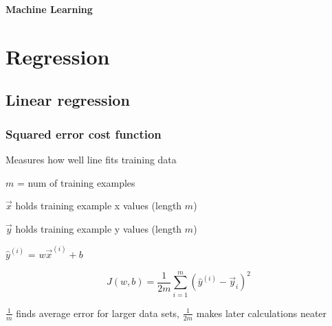 \documentclass[12pt]{article}
\begin{document}
\newcommand*\dif{\mathop{}\!\mathrm{d}}

\newenvironment{myitemize}
{ \begin{itemize}
    \setlength{\itemsep}{0pt}
    \setlength{\parskip}{0pt}
    \setlength{\parsep}{0pt}     }
{ \end{itemize}                  } 

\newenvironment{myenumerate}
{ \begin{enumerate}
    \setlength{\itemsep}{0pt}
    \setlength{\parskip}{0pt}
    \setlength{\parsep}{0pt}     }
{ \end{enumerate}                  } 

\begin{titlepage}
\begin{center}
\vspace*{2cm}
\begin{huge}\textbf{Machine Learning}\end{huge}
\end{center}
\end{titlepage}

\tableofcontents


\pagebreak

\section{Regression}

\subsection{Linear regression}
\subsubsection{Squared error cost function}

Measures how well line fits training data

$m$ = num of training examples

$\vec{x}$ holds training example x values (length $m$)

$\vec{y}$ holds training example y values (length $m$)

${\hat y}^{(i)}$ = $w\vec{x}^{(i)} + b$

\[ J(w,b) = \frac{1}{2m} \sum_{i=1}^m ({\hat y}^{(i)} - \vec{y}_i)^2 \]

$\frac{1}{m}$ finds average error for larger data sets, $\frac{1}{2m}$ makes later calculations neater
\end{document}
